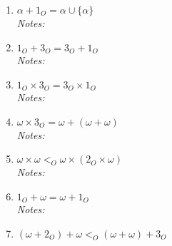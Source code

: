 \documentclass[justified]{tufte-handout}
\begin{document}
\begin{enumerate}[label=\roman*.]
\item $\alpha+1_O=\alpha\cup\{\alpha\}$\\

\noindent \emph{Notes:}  \underline{\hspace{15.4cm}}\\

\item $1_O+3_O=3_O+1_O$\\

\noindent \emph{Notes:}  \underline{\hspace{15.4cm}}\\

\item $1_O\times 3_O=3_O\times 1_O$\\

\noindent \emph{Notes:}  \underline{\hspace{15.4cm}}\\

\item $\omega\times 3_O=\omega+(\omega+\omega)$\\

\noindent \emph{Notes:}  \underline{\hspace{15.4cm}}\\

\item $\omega\times\omega<_O\omega\times(2_O\times\omega)$\\

\noindent \emph{Notes:}  \underline{\hspace{15.4cm}}\\

\item $1_O+\omega=\omega+1_O$\\

\noindent \emph{Notes:}  \underline{\hspace{15.4cm}}\\

\item $(\omega+2_O)+\omega<_O(\omega+\omega)+3_O$\\


\end{enumerate}
\end{document}
